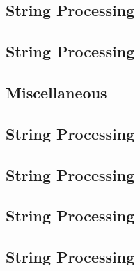 \subsection{String Processing}
\raggedbottom
\vspace{-.7\baselineskip}\hrulefill
\vspace{0.1\baselineskip}\subsection{String Processing}
\raggedbottom
\vspace{-.7\baselineskip}\hrulefill
\vspace{0.1\baselineskip}\subsection{Miscellaneous}
\raggedbottom
\vspace{-.7\baselineskip}\hrulefill
\vspace{0.1\baselineskip}\subsection{String Processing}
\raggedbottom
\vspace{-.7\baselineskip}\hrulefill
\vspace{0.1\baselineskip}\subsection{String Processing}
\raggedbottom
\vspace{-.7\baselineskip}\hrulefill
\vspace{0.1\baselineskip}\subsection{String Processing}
\raggedbottom
\vspace{-.7\baselineskip}\hrulefill
\vspace{0.1\baselineskip}\subsection{String Processing}
